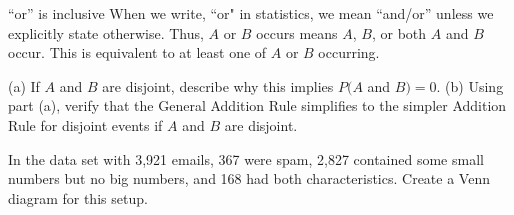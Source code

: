 \begin{onebox}{``or'' is inclusive}
When we write, ``or"  in statistics, we mean ``and/or'' unless we explicitly state otherwise. Thus, $A$ or $B$ occurs means $A$, $B$, or both $A$ and $B$ occur. This is equivalent to at least one of $A$ or $B$ occurring.\end{onebox}

\begin{exercisewrap}
\begin{nexercise}
(a) If $A$ and $B$ are disjoint, describe why this implies $P(A$ and $B) = 0$. (b) Using part (a), verify that the General Addition Rule simplifies to the simpler Addition Rule for disjoint events if $A$ and $B$ are disjoint.\footnotemark
\end{nexercise}
\end{exercisewrap}


\begin{exercisewrap}
\begin{nexercise}\label{emailSpamNumberVennExer}
In the  data set with 3,921 emails, 367 were spam, 2,827 contained some small numbers but no big numbers, and 168 had both characteristics. Create a Venn diagram for this setup.\footnotemark
\end{nexercise}
\end{exercisewrap}

